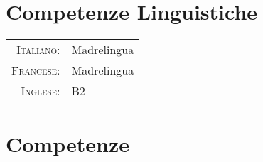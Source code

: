 \documentclass[a4paper,11pt]{article} %
\begin{document}

%
%


\section{Competenze Linguistiche}

\begin{tabular}{rl}

\textsc{Italiano:} & Madrelingua\\

\textsc{Francese:} & Madrelingua\\

\textsc{Inglese:} & B2\\
\end{tabular}


\section{Competenze}
\end{document}
